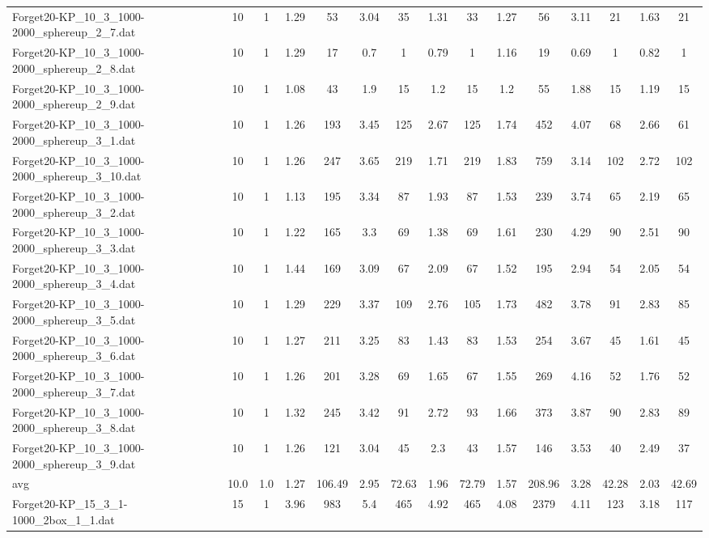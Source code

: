 \begin{table}[!ht]
{\begin{tabular}{lcccccccccccccc}
Forget20-KP\_10\_3\_1000-2000\_sphereup\_2\_7.dat & 10 & 1 & 1.29 & 53 & 3.04 & 35 & 1.31 & 33 & 1.27 & 56 & 3.11 & 21 & 1.63 & 21 \\
Forget20-KP\_10\_3\_1000-2000\_sphereup\_2\_8.dat & 10 & 1 & 1.29 & 17 & 0.7 & 1 & 0.79 & 1 & 1.16 & 19 & 0.69 & 1 & 0.82 & 1 \\
Forget20-KP\_10\_3\_1000-2000\_sphereup\_2\_9.dat & 10 & 1 & 1.08 & 43 & 1.9 & 15 & 1.2 & 15 & 1.2 & 55 & 1.88 & 15 & 1.19 & 15 \\
Forget20-KP\_10\_3\_1000-2000\_sphereup\_3\_1.dat & 10 & 1 & 1.26 & 193 & 3.45 & 125 & 2.67 & 125 & 1.74 & 452 & 4.07 & 68 & 2.66 & 61 \\
Forget20-KP\_10\_3\_1000-2000\_sphereup\_3\_10.dat & 10 & 1 & 1.26 & 247 & 3.65 & 219 & 1.71 & 219 & 1.83 & 759 & 3.14 & 102 & 2.72 & 102 \\
Forget20-KP\_10\_3\_1000-2000\_sphereup\_3\_2.dat & 10 & 1 & 1.13 & 195 & 3.34 & 87 & 1.93 & 87 & 1.53 & 239 & 3.74 & 65 & 2.19 & 65 \\
Forget20-KP\_10\_3\_1000-2000\_sphereup\_3\_3.dat & 10 & 1 & 1.22 & 165 & 3.3 & 69 & 1.38 & 69 & 1.61 & 230 & 4.29 & 90 & 2.51 & 90 \\
Forget20-KP\_10\_3\_1000-2000\_sphereup\_3\_4.dat & 10 & 1 & 1.44 & 169 & 3.09 & 67 & 2.09 & 67 & 1.52 & 195 & 2.94 & 54 & 2.05 & 54 \\
Forget20-KP\_10\_3\_1000-2000\_sphereup\_3\_5.dat & 10 & 1 & 1.29 & 229 & 3.37 & 109 & 2.76 & 105 & 1.73 & 482 & 3.78 & 91 & 2.83 & 85 \\
Forget20-KP\_10\_3\_1000-2000\_sphereup\_3\_6.dat & 10 & 1 & 1.27 & 211 & 3.25 & 83 & 1.43 & 83 & 1.53 & 254 & 3.67 & 45 & 1.61 & 45 \\
Forget20-KP\_10\_3\_1000-2000\_sphereup\_3\_7.dat & 10 & 1 & 1.26 & 201 & 3.28 & 69 & 1.65 & 67 & 1.55 & 269 & 4.16 & 52 & 1.76 & 52 \\
Forget20-KP\_10\_3\_1000-2000\_sphereup\_3\_8.dat & 10 & 1 & 1.32 & 245 & 3.42 & 91 & 2.72 & 93 & 1.66 & 373 & 3.87 & 90 & 2.83 & 89 \\
Forget20-KP\_10\_3\_1000-2000\_sphereup\_3\_9.dat & 10 & 1 & 1.26 & 121 & 3.04 & 45 & 2.3 & 43 & 1.57 & 146 & 3.53 & 40 & 2.49 & 37 \\
\hline avg & 10.0 & 1.0 & 1.27& 106.49 & 2.95& 72.63 & 1.96& 72.79 & 1.57& 208.96 & 3.28& 42.28 & 2.03& 42.69\\ \hline
Forget20-KP\_15\_3\_1-1000\_2box\_1\_1.dat & 15 & 1 & 3.96 & 983 & 5.4 & 465 & 4.92 & 465 & 4.08 & 2379 & 4.11 & 123 & 3.18 & 117 \\

\end{tabular}}
\end{table}
